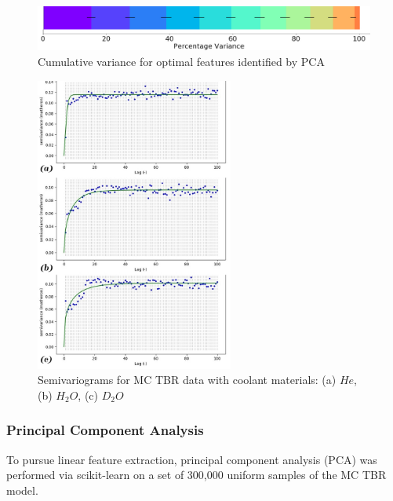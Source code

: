 \begin{figure}[h]
  \centering
    \includegraphics[width=0.6\linewidth]{fig2_pca.jpg}
    \caption{Cumulative variance for optimal features identified by PCA}
  \label{fig:pca}
\end{figure}

\begin{figure}
  \vspace{-55pt}
  \begin{center}
    \hspace*{-.3\columnsep}\includegraphics[width=0.58\textwidth]{fig3_allvar.jpg}
    \caption{Semivariograms for MC TBR data with coolant materials: (a) $He$, (b) $H_2O$, (c) $D_2O$}
    \label{fig:var}
  \end{center}
  \vspace{-110pt}
\end{figure}

\subsubsection{Principal Component Analysis}

To pursue linear feature extraction, principal component analysis (PCA) was performed via scikit-learn on a set of 300,000 uniform samples of the MC TBR model. 

